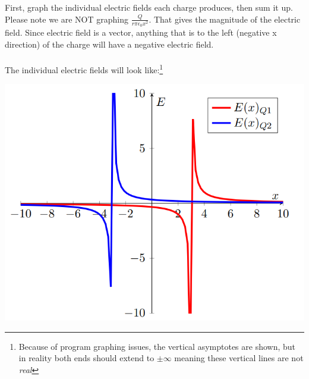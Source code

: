 \begin{solution}
First, graph the individual electric fields each charge produces, then sum it up. Please note we are NOT graphing $\frac{Q}{r\pi\epsilon_0x^2}$. That gives the magnitude of the electric field. Since electric field is a vector, anything that is to the left (negative x direction) of the charge will have a negative electric field.
\\\\
The individual electric fields will look like:\footnote{Because of program graphing issues, the vertical asymptotes are shown, but in reality both ends should extend to $\pm \infty$ meaning these vertical lines are not \emph{real}}

\begin{center}


\includegraphics{Figures/Figure210}
\end{center}


\end{solution}
